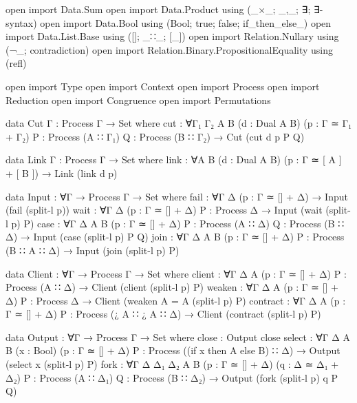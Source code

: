 \begin{code}
open import Data.Sum
open import Data.Product using (_×_; _,_; ∃; ∃-syntax)
open import Data.Bool using (Bool; true; false; if_then_else_)
open import Data.List.Base using ([]; _∷_; [_])
open import Relation.Nullary using (¬_; contradiction)
open import Relation.Binary.PropositionalEquality using (refl)

open import Type
open import Context
open import Process
open import Reduction
open import Congruence
open import Permutations

data Cut {Γ} : Process Γ → Set where
  cut :
    ∀{Γ₁ Γ₂ A B} (d : Dual A B) (p : Γ ≃ Γ₁ + Γ₂)
    {P : Process (A ∷ Γ₁)} {Q : Process (B ∷ Γ₂)} →
    Cut (cut d p P Q)

data Link {Γ} : Process Γ → Set where
  link :
    ∀{A B} (d : Dual A B) (p : Γ ≃ [ A ] + [ B ]) → Link (link d p)

data Input : ∀{Γ} → Process Γ → Set where
  fail :
    ∀{Γ Δ}
    (p : Γ ≃ [] + Δ) → Input (fail (split-l p))
  wait :
    ∀{Γ Δ} (p : Γ ≃ [] + Δ) {P : Process Δ} → Input (wait (split-l p) P)
  case :
    ∀{Γ Δ A B} (p : Γ ≃ [] + Δ) {P : Process (A ∷ Δ)} {Q : Process (B ∷ Δ)} →
    Input (case (split-l p) P Q)
  join :
    ∀{Γ Δ A B} (p : Γ ≃ [] + Δ) {P : Process (B ∷ A ∷ Δ)} →
    Input (join (split-l p) P)

data Client : ∀{Γ} → Process Γ → Set where
  client :
    ∀{Γ Δ A} (p : Γ ≃ [] + Δ)
    {P : Process (A ∷ Δ)} →
    Client (client (split-l p) P)
  weaken :
    ∀{Γ Δ A} (p : Γ ≃ [] + Δ)
    {P : Process Δ} →
    Client (weaken {A = A} (split-l p) P)
  contract :
    ∀{Γ Δ A} (p : Γ ≃ [] + Δ)
    {P : Process (¿ A ∷ ¿ A ∷ Δ)} →
    Client (contract (split-l p) P)

data Output : ∀{Γ} → Process Γ → Set where
  close : Output close
  select :
    ∀{Γ Δ A B} (x : Bool) (p : Γ ≃ [] + Δ) {P : Process ((if x then A else B) ∷ Δ)} →
    Output (select x (split-l p) P)
  fork :
    ∀{Γ Δ Δ₁ Δ₂ A B} (p : Γ ≃ [] + Δ) (q : Δ ≃ Δ₁ + Δ₂)
    {P : Process (A ∷ Δ₁)} {Q : Process (B ∷ Δ₂)} →
    Output (fork (split-l p) q P Q)


\end{code}

